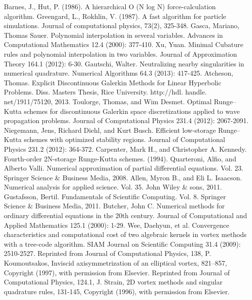 \documentclass[letterpaper,12pt]{report}
\begin{document}
\begin{thebibliography}{8}
Barnes, J.,  Hut, P. (1986). A hierarchical O (N log N) force-calculation algorithm.
Greengard, L.,  Rokhlin, V. (1987). A fast algorithm for particle simulations. Journal of computational physics, 73(2), 325-348.
Gasca, Mariano, Thomas Sauer. Polynomial interpolation in several variables. Advances in Computational Mathematics 12.4 (2000): 377-410.
Xu, Yuan. Minimal Cubature rules and polynomial interpolation in two variables. Journal of Approximation Theory 164.1 (2012): 6-30.
Gautschi, Walter. Neutralizing nearby singularities in numerical quadrature. Numerical Algorithms 64.3 (2013): 417-425.
Atcheson, Thomas. Explicit Discontinuous Galerkin Methods for Linear Hyperbolic Problems. Diss. Masters Thesis, Rice University. http://hdl. handle. net/1911/75120, 2013.
Toulorge, Thomas, and Wim Desmet. Optimal Runge–Kutta schemes for discontinuous Galerkin space discretizations applied to wave propagation problems. Journal of Computational Physics 231.4 (2012): 2067-2091.
Niegemann, Jens, Richard Diehl, and Kurt Busch. Efficient low-storage Runge–Kutta schemes with optimized stability regions. Journal of Computational Physics 231.2 (2012): 364-372.
Carpenter, Mark H., and Christopher A. Kennedy. Fourth-order 2N-storage Runge-Kutta schemes. (1994).
Quarteroni, Alfio, and Alberto Valli. Numerical approximation of partial differential equations. Vol. 23. Springer Science \& Business Media, 2008.
Allen, Myron B., and Eli L. Isaacson. Numerical analysis for applied science. Vol. 35. John Wiley \& sons, 2011.
Gustafsson, Bertil. Fundamentals of Scientific Computing. Vol. 8. Springer Science \& Business Media, 2011.
Butcher, John C. Numerical methods for ordinary differential equations in the 20th century. Journal of Computational and Applied Mathematics 125.1 (2000): 1-29.
Wee, Daehyun, et al. Convergence characteristics and computational cost of two algebraic kernels in vortex methods with a tree-code algorithm. SIAM Journal on Scientific Computing 31.4 (2009): 2510-2527.
Reprinted from  Journal of Computational Physics, 138, P. Koumoutsakos, Inviscid axisymmetrization of an elliptical vortex, 821–857, Copyright (1997), with permission from Elsevier.
Reprinted from Journal of Computational Physics, 124.1, J. Strain, 2D vortex methods and singular quadrature rules, 131-145, Copyright (1996), with permission from Elsevier.
\end{thebibliography}
\end{document}
